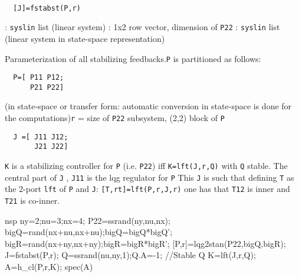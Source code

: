 \begin{mandesc}
   \\ %
\end{mandesc}
\begin{calling_sequence}
\begin{verbatim}
  [J]=fstabst(P,r)  
\end{verbatim}
\end{calling_sequence}
\begin{parameters}
  \begin{varlist}
    : \verb!syslin! list (linear system)
    : 1x2 row vector, dimension of \verb!P22!
    : \verb!syslin! list (linear system in state-space representation)
  \end{varlist}
\end{parameters}
\begin{mandescription}
  Parameterization of all stabilizing feedbacks.\verb!P! is partitioned as follows:
\begin{verbatim}
  P=[ P11 P12;
      P21 P22]  
\end{verbatim}
(in state-space or transfer form: automatic conversion in state-space is
done for the computations)\verb!r! = size of  \verb!P22! subsystem, (2,2) block of \verb!P!
\begin{verbatim}
  J =[ J11 J12;
       J21 J22]
\end{verbatim}
\verb!K! is a stabilizing controller for \verb!P! (i.e. \verb!P22!) iff 
\verb!K=lft(J,r,Q)! with \verb!Q! stable.
The central part of \verb!J! , \verb!J11! is the lqg regulator for \verb!P!
This \verb!J! is such that defining \verb!T! as the 2-port \verb!lft! of \verb!P!
and \verb!J!: \verb![T,rt]=lft(P,r,J,r)! one has that \verb!T12! is inner
and \verb!T21! is co-inner.
\end{mandescription}
\begin{examples}
  \begin{mintednsp}{nsp}
    ny=2;nu=3;nx=4;
    P22=ssrand(ny,nu,nx);
    bigQ=rand(nx+nu,nx+nu);bigQ=bigQ*bigQ';
    bigR=rand(nx+ny,nx+ny);bigR=bigR*bigR';
    [P,r]=lqg2stan(P22,bigQ,bigR);
    J=fstabst(P,r);
    Q=ssrand(nu,ny,1);Q.A=-1;  //Stable Q
    K=lft(J,r,Q);
    A=h_cl(P,r,K); spec(A)
  \end{mintednsp}
\end{examples}
\begin{manseealso}
       
\end{manseealso}
